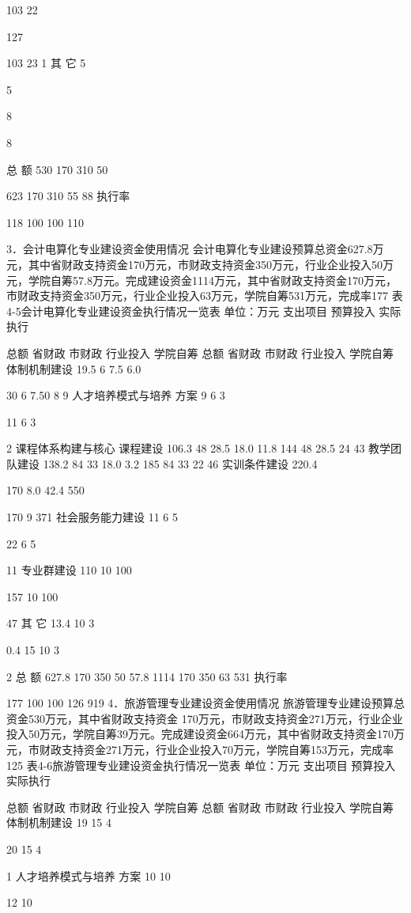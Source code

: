 103
22

127

103
23
1
其 它
5


5

8


8

总    额
530
170
310
50

623
170
310
55
88
执行率%

118
100
100
110

3．会计电算化专业建设资金使用情况
会计电算化专业建设预算总资金627.8万元，其中省财政支持资金170万元，市财政支持资金350万元，行业企业投入50万元，学院自筹57.8万元。完成建设资金1114万元，其中省财政支持资金170万元，市财政支持资金350万元，行业企业投入63万元，学院自筹531万元，完成率177%
表4-5会计电算化专业建设资金执行情况一览表
单位：万元
支出项目
预算投入
实际执行

总额
省财政
市财政
行业投入
学院自筹
总额
省财政
市财政
行业投入
学院自筹
体制机制建设
19.5
6
7.5
6.0

30
6
7.50
8
9
人才培养模式与培养
方案
9
6
3


11
6
3

2
课程体系构建与核心
课程建设
106.3
48
28.5
18.0
11.8
144
48
28.5
24
43
教学团队建设
138.2
84
33
18.0
3.2
185
84
33
22
46
实训条件建设
220.4

170
8.0
42.4
550

170
9
371
社会服务能力建设
11
6
5


22
6
5

11
专业群建设
110
10
100


157
10
100

47
其 它
13.4
10
3

0.4
15
10
3

2
总    额
627.8
170
350
50
57.8
1114
170
350
63
531
执行率%

177
100
100
126
919
4．旅游管理专业建设资金使用情况
旅游管理专业建设预算总资金530万元，其中省财政支持资金  170万元，市财政支持资金271万元，行业企业投入50万元，学院自筹39万元。完成建设资金664万元，其中省财政支持资金170万元，市财政支持资金271万元，行业企业投入70万元，学院自筹153万元，完成率125%
表4-6旅游管理专业建设资金执行情况一览表
单位：万元
支出项目
预算投入
实际执行

总额
省财政
市财政
行业投入
学院自筹
总额
省财政
市财政
行业投入
学院自筹
体制机制建设
19
15
4


20
15
4

1
人才培养模式与培养
方案
10
10



12
10


